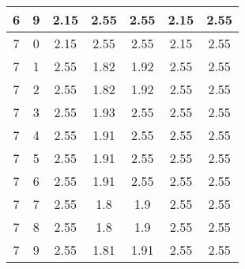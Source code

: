 \begin{longtable}{|c|c||c||c|c||c|c|}
	6 & 9 & 2.15 & 2.55 & 2.55 & 2.15 & 2.55 \\ \hline
	7 & 0 & 2.15 & 2.55 & 2.55 & 2.15 & 2.55 \\ \hline
	7 & 1 & 2.55 & 1.82 & 1.92 & 2.55 & 2.55 \\ \hline
	7 & 2 & 2.55 & 1.82 & 1.92 & 2.55 & 2.55 \\ \hline
	7 & 3 & 2.55 & 1.93 & 2.55 & 2.55 & 2.55 \\ \hline
	7 & 4 & 2.55 & 1.91 & 2.55 & 2.55 & 2.55 \\ \hline
	7 & 5 & 2.55 & 1.91 & 2.55 & 2.55 & 2.55 \\ \hline
	7 & 6 & 2.55 & 1.91 & 2.55 & 2.55 & 2.55 \\ \hline
	7 & 7 & 2.55 & 1.8 & 1.9 & 2.55 & 2.55 \\ \hline
	7 & 8 & 2.55 & 1.8 & 1.9 & 2.55 & 2.55 \\ \hline
	7 & 9 & 2.55 & 1.81 & 1.91 & 2.55 & 2.55 \\ \hline
\end{longtable}
\clearpage{}
